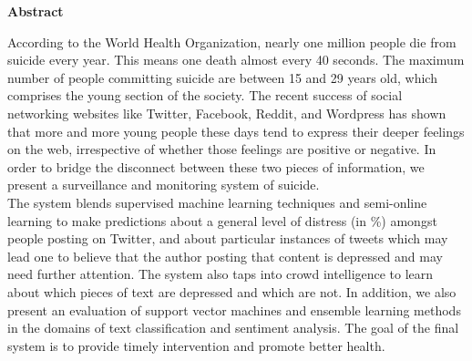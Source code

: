 
\clearemptydoublepage
{}
{}

\vspace*{2cm}
\begin{center}
{\Large \bf Abstract}
\end{center}
\vspace{1cm}

According to the World Health Organization, nearly one million people die from suicide every year. This means one death almost every 40 seconds. The maximum number of people committing suicide are between 15 and 29 years old, which comprises the young section of the society. The recent success of social networking websites like Twitter, Facebook, Reddit, and Wordpress has shown that more and more young people these days tend to express their deeper feelings on the web, irrespective of whether those feelings are positive or negative. In order to bridge the disconnect between these two pieces of information, we present a surveillance and monitoring system of suicide.\\

The system blends supervised machine learning techniques and semi-online learning to make predictions about a general level of distress (in \%) amongst people posting on Twitter, and about particular instances of tweets which may lead one to believe that the author posting that content is depressed and may need further attention. The system also taps into crowd intelligence to learn about which pieces of text are depressed and which are not. In addition, we also present an evaluation of support vector machines and ensemble learning methods in the domains of text classification and sentiment analysis. The goal of the final system is to provide timely intervention and promote better health.

